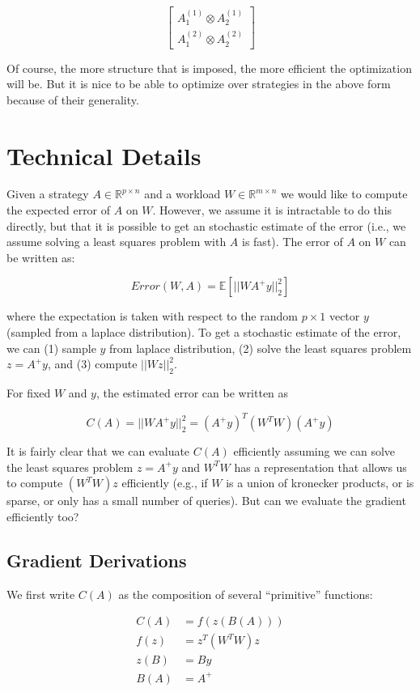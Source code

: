 \documentclass[12]{article}
\begin{document}
$$ \begin{bmatrix} A^{(1)}_1 \otimes A^{(1)}_2 \\ A^{(2)}_1 \otimes A^{(2)}_2 \end{bmatrix} $$

Of course, the more structure that is imposed, the more efficient the optimization will be.  But it is nice to be able to optimize over strategies in the above form because of their generality.  

\section{Technical Details}

Given a strategy $A \in \mathbb{R}^{p \times n}$ and a workload $ W \in \mathbb{R}^{m \times n} $ we would like to compute the expected error of $A$ on $W$.  However, we assume it is intractable to do this directly, but that it is possible to get an stochastic estimate of the error (i.e., we assume solving a least squares problem with $A$ is fast).  The error of $A$ on $W$ can be written as:

$$ Error(W, A) = \mathbb{E}[|| W A^+ y ||_2^2] $$

where the expectation is taken with respect to the random $p \times 1 $ vector $y$ (sampled from a laplace distribution).  To get a stochastic estimate of the error, we can (1) sample $y$ from laplace distribution, (2) solve the least squares problem $z = A^+ y$, and (3) compute $ || W z ||_2^2 $.

For fixed $W$ and $y$, the estimated error can be written as 

$$ C(A) = || W A^+ y ||_2^2 = (A^+ y)^T (W^T W) (A^+ y) $$

It is fairly clear that we can evaluate $C(A)$ efficiently assuming we can solve the least squares problem $z = A^+ y$ and $W^T W$ has a representation that allows us to compute $(W^T W) z$ efficiently (e.g., if $W$ is a union of kronecker products, or is sparse, or only has a small number of queries).  But can we evaluate the gradient efficiently too?

\subsection{Gradient Derivations}

We first write $C(A)$ as the composition of several ``primitive'' functions:

\begin{align*}
C(A) &= f(z(B(A))) \\
f(z) &= z^T (W^T W) z \\
z(B) &= B y \\
B(A) &= A^+ \\
\end{align*}
\end{document}
